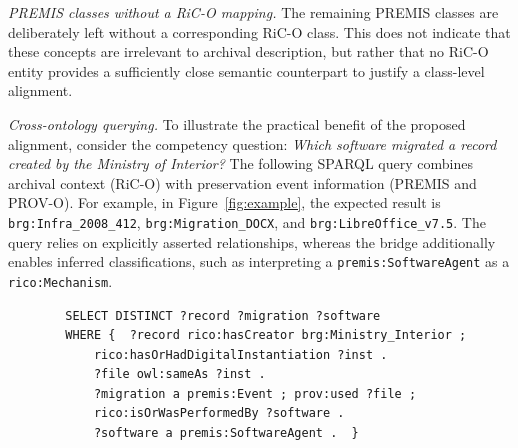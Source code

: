 \documentclass[runningheads]{llncs}
\begin{document}
\emph{PREMIS classes without a RiC-O mapping.}
The remaining PREMIS classes are deliberately left without a corresponding
RiC-O class. This does not indicate that these concepts are irrelevant to
archival description, but rather that no RiC-O entity provides a sufficiently
close semantic counterpart to justify a class-level alignment. 

\emph{Cross-ontology querying.}
To illustrate the practical benefit of the proposed alignment,
consider the competency question: \emph{Which software migrated
	a record created by the Ministry of Interior?}
The following SPARQL query combines archival context (RiC-O)
with preservation event information (PREMIS and PROV-O). For example, in Figure~\ref{fig:example}, the expected result is
\texttt{brg:Infra\_2008\_412},
\texttt{brg:Migration\_DOCX}, and
\texttt{brg:LibreOffice\_v7.5}.
The query relies on explicitly asserted relationships,
whereas the bridge additionally enables inferred classifications,
such as interpreting a \texttt{premis:SoftwareAgent}
as a \texttt{rico:Mechanism}.


{\footnotesize
		\begin{verbatim}
		SELECT DISTINCT ?record ?migration ?software
		WHERE {  ?record rico:hasCreator brg:Ministry_Interior ;
			rico:hasOrHadDigitalInstantiation ?inst .
			?file owl:sameAs ?inst .
			?migration a premis:Event ; prov:used ?file ;
			rico:isOrWasPerformedBy ?software .
			?software a premis:SoftwareAgent . 	}
	\end{verbatim}
}

\end{document}
